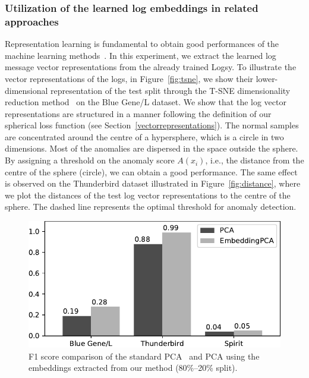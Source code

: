 \subsubsection{Utilization of the learned log embeddings in related approaches}
Representation learning is fundamental to obtain good performances of the machine learning methods~\cite{bengio2013representation}. In this experiment, we extract the learned log message vector representations from the already trained Logsy. To illustrate the vector representations of the logs, in Figure~\ref{fig:tsne}, we show their lower-dimensional representation of the test split through the T-SNE dimensionality reduction method~\cite{maaten2008visualizing} on the Blue Gene/L dataset. We show that the log vector representations are structured in a manner following the definition of our spherical loss function (see Section~\ref{vectorrepresentations}). The normal samples are concentrated around the centre of a hypersphere, which is a circle in two dimensions. Most of the anomalies are dispersed in the space outside the sphere. By assigning a threshold on the anomaly score $A(x_i)$, i.e., the distance from the centre of the sphere (circle), we can obtain a good performance. The same effect is observed on the Thunderbird dataset illustrated in Figure~\ref{fig:distance}, where we plot the distances of the test log vector representations to the centre of the sphere. The dashed line represents the optimal threshold for anomaly detection.  


\begin{figure}[!t]
    \centering
    \includegraphics[scale=0.9]{gfx/chap4/pcaembeddings.pdf}
    \caption{F1 score comparison of the standard PCA~\cite{xu2009detecting} and PCA using the embeddings extracted from our method (80\%--20\% split).}
    \label{fig:pcaembeddings}
\end{figure}



